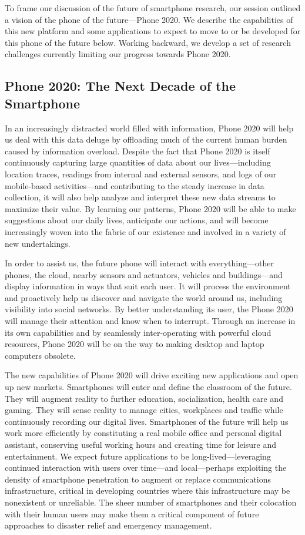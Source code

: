 To frame our discussion of the future of smartphone research, our session
outlined a vision of the phone of the future---Phone 2020. We describe the
capabilities of this new platform and some applications to expect to move to
or be developed for this phone of the future below. Working backward, we
develop a set of research challenges currently limiting our progress towards
Phone 2020.

\subsection{Phone 2020: The Next Decade of the Smartphone}

In an increasingly distracted world filled with information, Phone 2020 will
help us deal with this data deluge by offloading much of the current human
burden caused by information overload. Despite the fact that Phone 2020 is
itself continuously capturing large quantities of data about our
lives---including location traces, readings from internal and external sensors,
and logs of our mobile-based activities---and contributing to the steady
increase in data collection, it will also help analyze and interpret these
new data streams to maximize their value. By learning our patterns, Phone
2020 will be able to make suggestions about our daily lives, anticipate our
actions, and will become increasingly woven into the fabric of our existence
and involved in a variety of new undertakings.
 
In order to assist us, the future phone will interact with everything---other
phones, the cloud, nearby sensors and actuators, vehicles and buildings---and
display information in ways that suit each user. It will process the
environment and proactively help us discover and navigate the world around
us, including visibility into social networks. By better understanding its
user, the Phone 2020 will manage their attention and know when to interrupt.
Through an increase in its own capabilities and by seamlessly inter-operating
with powerful cloud resources, Phone 2020 will be on the way to making
desktop and laptop computers obsolete.
 
The new capabilities of Phone 2020 will drive exciting new applications and
open up new markets. Smartphones will enter and define the classroom of the
future. They will augment reality to further education, socialization, health
care and gaming. They will sense reality to manage cities, workplaces and
traffic while continuously recording our digital lives. Smartphones of the
future will help us work more efficiently by constituting a real mobile
office and personal digital assistant, conserving useful working hours and
creating time for leisure and entertainment. We expect future applications to
be long-lived---leveraging continued interaction with users over time---and
local---perhaps exploiting the density of smartphone penetration to augment
or replace communications infrastructure, critical in developing countries
where this infrastructure may be nonexistent or unreliable. The sheer number
of smartphones and their colocation with their human users may make them a
critical component of future approaches to disaster relief and emergency
management.
 
